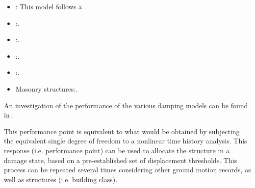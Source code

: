 \begin{itemize}
\item \citep{FEMA4402005}: This model follows a .
\item \citep{Kowalsky1994}:.
\item \citep{Iwan1980}:.
\item \citep{GulkanSozen1974}:.
\item \citep{PriesleyEtAl2007}:.
\item Masonry structures:.\\

\end{itemize}

An investigation of the performance of the various damping models can be found in \cite{FEMA4402005}.

This performance point is equivalent to what would be obtained by subjecting the equivalent single degree of freedom to a nonlinear time history analysis. This response (i.e. performance point) can be used to allocate the structure in a damage state, based on a pre-established set of displacement thresholds. This process can be repeated several times considering other ground motion records, as well as structures (i.e. building class).